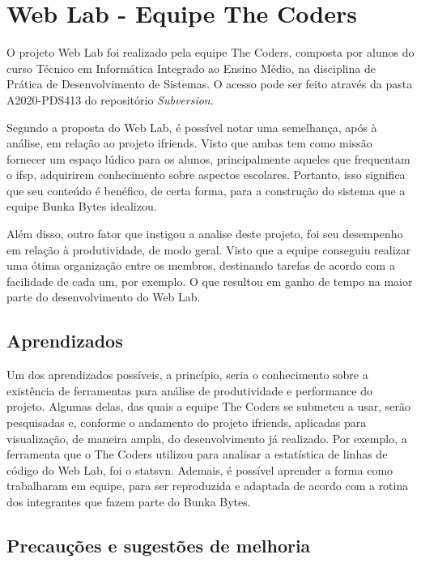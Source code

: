 \chapter[Web Lab]{Web Lab - Equipe The Coders}
\label{weblab}

O projeto Web Lab foi realizado pela equipe The Coders, composta por alunos do curso Técnico em Informática Integrado ao Ensino Médio, na disciplina de Prática de Desenvolvimento de Sistemas. O acesso pode ser feito através da pasta A2020-PDS413 do repositório \textsl{Subversion}.

Segundo a proposta do Web Lab, é possível notar uma semelhança, após à análise, em relação ao projeto \gls{ifriends}. Visto que ambas tem como missão fornecer um espaço lúdico para os alunos, principalmente aqueles que frequentam o \acs{ifsp}, adquirirem conhecimento sobre aspectos escolares. Portanto, isso significa que seu conteúdo é benéfico, de certa forma, para a construção do sistema que a equipe Bunka Bytes idealizou.

Além disso, outro fator que instigou a analise deste projeto, foi seu desempenho em relação à produtividade, de modo geral. Visto que a equipe conseguiu realizar uma ótima organização entre os membros, destinando tarefas de acordo com a facilidade de cada um, por exemplo. O que resultou em ganho de tempo na maior parte do  desenvolvimento do Web Lab.

\section[Aprendizados]{Aprendizados}

Um dos aprendizados possíveis, a princípio, seria o conhecimento sobre a existência de ferramentas para análise de produtividade e performance do projeto. Algumas delas, das quais a equipe The Coders se submeteu a usar, serão pesquisadas e, conforme o andamento do projeto \gls{ifriends}, aplicadas para visualização, de maneira ampla, do desenvolvimento já realizado. Por exemplo, a ferramenta que o The Coders utilizou para analisar a estatística de linhas de código do Web Lab, foi o \gls{statsvn}. Ademais, é possível aprender a forma como trabalharam em equipe, para ser reproduzida e adaptada de acordo com a rotina dos integrantes que fazem parte do Bunka Bytes.  

\section[Precauções]{Precauções e sugestões de melhoria}

